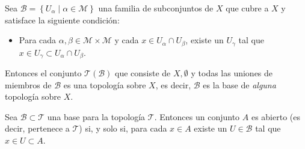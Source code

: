 \documentclass[fleqn,leqno,10pt,letterpaper,draft]{article}
\begin{document}
\begin{teo}\label{base1}
	Sea $\mathcal{B}=\left\{ U_\alpha \mid \alpha\in \mathscr{M} \right\}$ una familia de subconjuntos de $X$
	que cubre a $X$ y satisface la siguiente condición:
	\begin{itemize}
		\item 	Para cada $\alpha,\beta\in\mathscr{M}\times\mathscr{M}$ y cada $x\in U_\alpha\cap U_\beta$,
	existe un $U_\gamma$ tal que $x\in U_\gamma\subset U_\alpha\cap U_\beta$.
	\end{itemize}
	
	Entonces el conjunto $\mathcal{T}(\mathcal{B})$ que consiste de $X,\emptyset$ y todas las uniones de miembros
	de $\mathcal{B}$ es una topología sobre $X$, es decir, $\mathcal{B}$ es la base de \emph{alguna}
	topología sobre $X$.
\end{teo}

\begin{teo}\label{base2}
	Sea $\mathcal{B}\subset\mathcal{T}$ una base para la topología $\mathcal{T}$. Entonces un conjunto $A$
	es abierto (es decir, pertenece a $\mathcal{T}$) si, y solo si, para cada $x\in A$ existe un
	$U\in\mathcal{B}$ tal que $x\in U\subset A$.
\end{teo}

\printbibliography[
heading=bibintoc,
title={Referencias}
]
\end{document}
